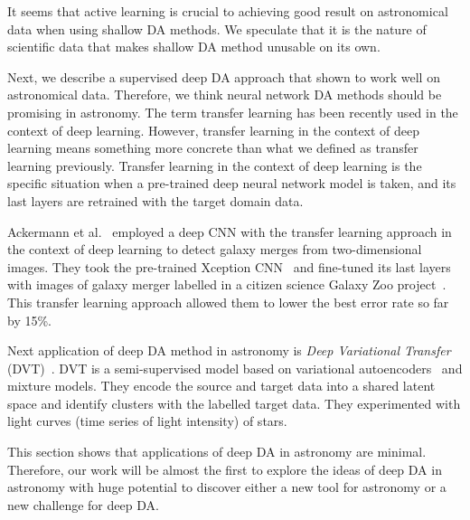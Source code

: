 It seems that active learning is crucial
to achieving good result on astronomical data when using shallow DA methods.
We speculate that it is the nature of scientific data
that makes shallow DA method unusable on its own.

Next, we describe a supervised deep DA  approach
that shown to work well on astronomical data.
Therefore, we think neural network DA methods should be promising in astronomy.
The term transfer learning has been recently used in the context of deep learning.
However, transfer learning in the context of deep learning means something more concrete than what we defined as transfer learning previously.
Transfer learning in the context of deep learning is the specific situation
when a pre-trained deep neural network model is taken,
and its last layers are retrained with the target domain data.

Ackermann et al.~\cite{ackermann2018} employed a deep CNN
with the transfer learning approach
in the context of deep learning to detect galaxy merges
from two-dimensional images.
They took the pre-trained Xception CNN~\cite{chollet2017}
and fine-tuned its last layers with images of galaxy merger labelled
in a citizen science Galaxy Zoo project~\cite{lintott2010}.
This transfer learning approach allowed them to lower the best error rate so far by 15\%.

Next application of deep DA method in astronomy is \textit{Deep Variational Transfer} (DVT)~\cite{belhaj2018}.
DVT is a semi-supervised model based on variational autoencoders~\cite{kingma2014a} and mixture models.
They encode the source and target data into a shared latent space
and identify clusters with the labelled target data.
They experimented with light curves (time series of light intensity) of stars.

This section shows that applications of deep DA in astronomy are minimal.
Therefore, our work will be almost the first to explore the ideas
of deep DA in astronomy with huge potential to discover
either a new tool for astronomy or a new challenge for deep DA.
